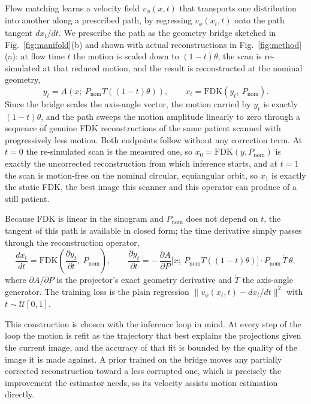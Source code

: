 \documentclass[11pt]{article}
\newcommand{\FDK}{\mathrm{FDK}}
\newcommand{\Pnom}{P_{\mathrm{nom}}}
\begin{document}
Flow matching learns a velocity field $v_\phi(x,t)$ that transports one distribution into
another along a prescribed path, by regressing $v_\phi(x_t,t)$ onto the path tangent
$dx_t/dt$. We prescribe the path as the geometry bridge sketched in
Fig.~\ref{fig:manifold}(b) and shown with actual reconstructions in
Fig.~\ref{fig:method}(a): at flow time $t$ the motion is scaled down to $(1-t)\theta$, the
scan is re-simulated at that reduced motion, and the result is reconstructed at the nominal
geometry,
\begin{equation}
y_t = A\!\left(x;\ \Pnom T((1-t)\theta)\right), \qquad
x_t = \FDK(y_t,\ \Pnom).
\label{eq:bridge}
\end{equation}
Since the bridge scales the axis-angle vector, the motion carried by $y_t$ is exactly
$(1-t)\theta$, and the path sweeps the motion amplitude linearly to zero through a sequence
of genuine FDK reconstructions of the same patient scanned with progressively less motion.
Both endpoints follow without any correction term. At $t{=}0$ the re-simulated scan is the
measured one, so $x_0 = \FDK(y,\Pnom)$ is exactly the uncorrected reconstruction from which
inference starts, and at $t{=}1$ the scan is motion-free on the nominal circular,
equiangular orbit, so $x_1$ is exactly the static FDK, the best image this scanner and this
operator can produce of a still patient.

Because FDK is linear in the sinogram and $\Pnom$ does not depend on $t$, the tangent of
this path is available in closed form; the time derivative simply passes through the
reconstruction operator,
\begin{equation}
\frac{dx_t}{dt} = \FDK\!\left(\frac{\partial y_t}{\partial t},\ \Pnom\right),
\qquad
\frac{\partial y_t}{\partial t}
= -\,\frac{\partial A}{\partial P}\Big[x;\ \Pnom T((1-t)\theta)\Big]\cdot \Pnom\,\dot{T}\,\theta,
\label{eq:tangent}
\end{equation}
where $\partial A/\partial P$ is the projector's exact geometry derivative and $\dot T$ the
axis-angle generator. The training loss is the plain regression
$\|v_\phi(x_t,t) - dx_t/dt\|^2$ with $t\sim\mathcal{U}[0,1]$.

This construction is chosen with the inference loop in mind. At every step of the loop the
motion is refit as the trajectory that best explains the projections given the current
image, and the accuracy of that fit is bounded by the quality of the image it is made
against. A prior trained on the bridge moves any partially corrected reconstruction toward
a less corrupted one, which is precisely the improvement the estimator needs, so its
velocity assists motion estimation directly.
\end{document}
